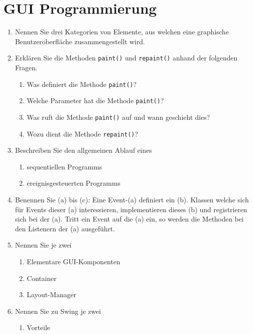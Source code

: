 \newpage
\section{GUI Programmierung}

\begin{enumerate}
    \item Nennen Sie drei Kategorien von Elemente, aus welchen eine
        graphische Benutzeroberfläche zusammengestellt wird.
    \item Erklären Sie die Methoden \verb?paint()? und \verb?repaint()?
        anhand der folgenden Fragen.
        \begin{enumerate}[label=(\alph*)]
            \item Was definiert die Methode \verb?paint()??
            \item Welche Parameter hat die Methode \verb?paint()??
            \item Was ruft die Methode \verb?paint()? auf und wann 
                geschieht dies?
            \item Wozu dient die Methode \verb?repaint()??
        \end{enumerate}
    \item Beschreiben Sie den allgemeinen Ablauf eines 
        \begin{enumerate}[label=(\alph*)]
            \item sequentiellen Programms
            \item ereignisgesteuerten Programms
        \end{enumerate}
    \item Benennen Sie (a) bis (c): Eine Event-(a) definiert ein (b).
        Klassen welche sich für Events dieser (a) interessieren, 
        implementieren dieses (b) und registrieren sich bei der (a).
        Tritt ein Event auf die (a) ein, so werden die Methoden bei
        den Listenern der (a) ausgeführt.
    \item Nennen Sie je zwei
        \begin{enumerate}[label=(\alph*)]
            \item Elementare GUI-Komponenten
            \item Container
            \item Layout-Manager
        \end{enumerate}
    \item Nennen Sie zu Swing je zwei 
        \begin{enumerate}[label=(\alph*)]
            \item Vorteile

\end{enumerate}
\end{enumerate}
